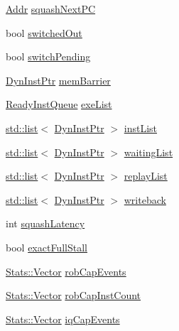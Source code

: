 \begin{DoxyCompactItemize}
\item 
\hyperlink{base_2types_8hh_af1bb03d6a4ee096394a6749f0a169232}{Addr} \hyperlink{classLWBackEnd_aabe0c73b4678ef858d3363c9bed18906}{squashNextPC}
\item 
bool \hyperlink{classLWBackEnd_a1aee6db9bfb75cf02e38a82e5d02847f}{switchedOut}
\item 
bool \hyperlink{classLWBackEnd_ace47ce39eea04902597d72ae3040c322}{switchPending}
\item 
\hyperlink{classLWBackEnd_a028ce10889c5f6450239d9e9a7347976}{DynInstPtr} \hyperlink{classLWBackEnd_aba4f4d748e592a95e9a44184b2f4cfa9}{memBarrier}
\item 
\hyperlink{classLWBackEnd_a60636ae8f3b649078c4f1bdd3b20dcad}{ReadyInstQueue} \hyperlink{classLWBackEnd_a033c224149bfca7d589121bf77f1b681}{exeList}
\item 
\hyperlink{classstd_1_1list}{std::list}$<$ \hyperlink{classLWBackEnd_a028ce10889c5f6450239d9e9a7347976}{DynInstPtr} $>$ \hyperlink{classLWBackEnd_ae10a391d02ce1ef67ee13cd82b7d46e5}{instList}
\item 
\hyperlink{classstd_1_1list}{std::list}$<$ \hyperlink{classLWBackEnd_a028ce10889c5f6450239d9e9a7347976}{DynInstPtr} $>$ \hyperlink{classLWBackEnd_a01b09fb4e81dae8e11ca298561afebe9}{waitingList}
\item 
\hyperlink{classstd_1_1list}{std::list}$<$ \hyperlink{classLWBackEnd_a028ce10889c5f6450239d9e9a7347976}{DynInstPtr} $>$ \hyperlink{classLWBackEnd_a75af5d227f5f7bbb93a6bb4bf680e6ee}{replayList}
\item 
\hyperlink{classstd_1_1list}{std::list}$<$ \hyperlink{classLWBackEnd_a028ce10889c5f6450239d9e9a7347976}{DynInstPtr} $>$ \hyperlink{classLWBackEnd_ae4b76f4612be07d13b349e13ee9dfa16}{writeback}
\item 
int \hyperlink{classLWBackEnd_a440f8cda1481977c324a827c7c9f1e24}{squashLatency}
\item 
bool \hyperlink{classLWBackEnd_a319e9530b28153883e886be5b9c573eb}{exactFullStall}
\item 
\hyperlink{classStats_1_1Vector}{Stats::Vector} \hyperlink{classLWBackEnd_a746b17c64f4337f2cf0bd3eb37df8cf5}{robCapEvents}
\item 
\hyperlink{classStats_1_1Vector}{Stats::Vector} \hyperlink{classLWBackEnd_aea092d89c0e23a99adfd1aa642e8ad37}{robCapInstCount}
\item 
\hyperlink{classStats_1_1Vector}{Stats::Vector} \hyperlink{classLWBackEnd_a18e004a2b90fafdb8e602ab4fd99f971}{iqCapEvents}
\item 

\end{DoxyCompactItemize}
